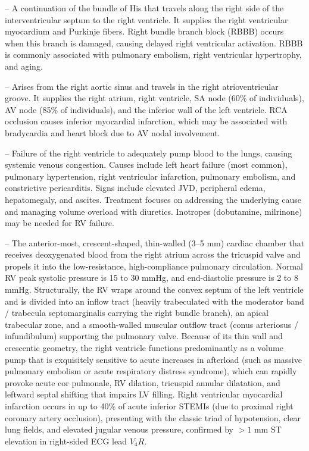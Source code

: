-- A continuation of the bundle of His that travels along the right side of the interventricular septum to the right ventricle. It supplies the right ventricular myocardium and Purkinje fibers. Right bundle branch block (RBBB) occurs when this branch is damaged, causing delayed right ventricular activation. RBBB is commonly associated with pulmonary embolism, right ventricular hypertrophy, and aging.

-- Arises from the right aortic sinus and travels in the right atrioventricular groove. It supplies the right atrium, right ventricle, SA node (60\% of individuals), AV node (85\% of individuals), and the inferior wall of the left ventricle. RCA occlusion causes inferior myocardial infarction, which may be associated with bradycardia and heart block due to AV nodal involvement.

-- Failure of the right ventricle to adequately pump blood to the lungs, causing systemic venous congestion. Causes include left heart failure (most common), pulmonary hypertension, right ventricular infarction, pulmonary embolism, and constrictive pericarditis. Signs include elevated JVD, peripheral edema, hepatomegaly, and ascites. Treatment focuses on addressing the underlying cause and managing volume overload with diuretics. Inotropes (dobutamine, milrinone) may be needed for RV failure.

-- The anterior-most, crescent-shaped, thin-walled (3--5 mm) cardiac chamber that receives deoxygenated blood from the right atrium across the tricuspid valve and propels it into the low-resistance, high-compliance pulmonary circulation. Normal RV peak systolic pressure is 15 to 30 mmHg, and end-diastolic pressure is 2 to 8 mmHg. Structurally, the RV wraps around the convex septum of the left ventricle and is divided into an inflow tract (heavily trabeculated with the moderator band / trabecula septomarginalis carrying the right bundle branch), an apical trabecular zone, and a smooth-walled muscular outflow tract (conus arteriosus / infundibulum) supporting the pulmonary valve. Because of its thin wall and crescentic geometry, the right ventricle functions predominantly as a volume pump that is exquisitely sensitive to acute increases in afterload (such as massive pulmonary embolism or acute respiratory distress syndrome), which can rapidly provoke acute cor pulmonale, RV dilation, tricuspid annular dilatation, and leftward septal shifting that impairs LV filling. Right ventricular myocardial infarction occurs in up to 40\% of acute inferior STEMIs (due to proximal right coronary artery occlusion), presenting with the classic triad of hypotension, clear lung fields, and elevated jugular venous pressure, confirmed by $>1$ mm ST elevation in right-sided ECG lead $V_4R$.

